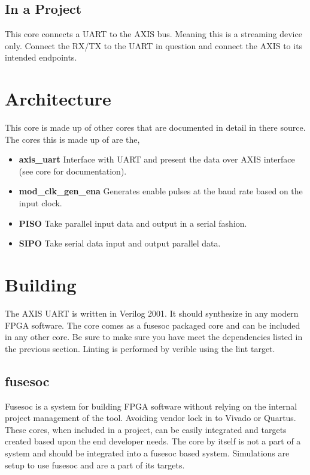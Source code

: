 \subsection{In a Project}
\par
This core connects a UART to the AXIS bus. Meaning this is a streaming device only. Connect the RX/TX to the UART in question and connect the AXIS to its intended endpoints.

\section{Architecture}
\par
This core is made up of other cores that are documented in detail in there source. The cores this is made up of are the,
\begin{itemize}
  \item \textbf{axis\_uart} Interface with UART and present the data over AXIS interface (see core for documentation).
  \item \textbf{mod\_clk\_gen\_ena} Generates enable pulses at the baud rate based on the input clock.
  \item \textbf{PISO} Take parallel input data and output in a serial fashion.
  \item \textbf{SIPO} Take serial data input and output parallel data.
\end{itemize}

\section{Building}

\par
The AXIS UART is written in Verilog 2001. It should synthesize in any modern FPGA software. The core comes as a fusesoc packaged core and can be included in any other core. Be sure to make sure you have meet the dependencies listed in the previous section. Linting is performed by verible using the lint target.

\subsection{fusesoc}
\par
Fusesoc is a system for building FPGA software without relying on the internal project management of the tool. Avoiding vendor lock in to Vivado or Quartus.
These cores, when included in a project, can be easily integrated and targets created based upon the end developer needs. The core by itself is not a part of
a system and should be integrated into a fusesoc based system. Simulations are setup to use fusesoc and are a part of its targets.

